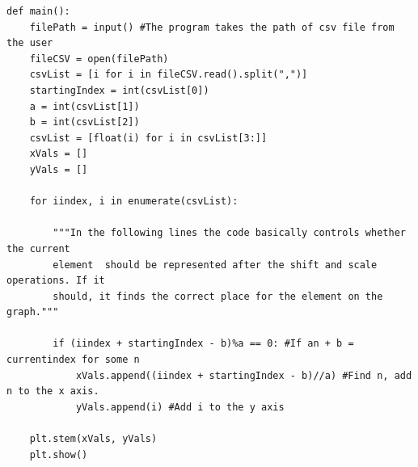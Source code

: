 \documentclass[10pt,a4paper, margin=1in]{article}
\begin{document}
\begin{enumerate}
\begin{enumerate}
\begin{lstlisting}
def main():
    filePath = input() #The program takes the path of csv file from the user
    fileCSV = open(filePath)
    csvList = [i for i in fileCSV.read().split(",")]
    startingIndex = int(csvList[0])
    a = int(csvList[1])
    b = int(csvList[2])
    csvList = [float(i) for i in csvList[3:]]
    xVals = []
    yVals = []

    for iindex, i in enumerate(csvList):

        """In the following lines the code basically controls whether the current
        element  should be represented after the shift and scale operations. If it 
        should, it finds the correct place for the element on the graph."""
        
        if (iindex + startingIndex - b)%a == 0: #If an + b = currentindex for some n
            xVals.append((iindex + startingIndex - b)//a) #Find n, add n to the x axis.
            yVals.append(i) #Add i to the y axis

    plt.stem(xVals, yVals)
    plt.show()



\end{lstlisting}
\end{enumerate}
\end{enumerate}
\end{document}

